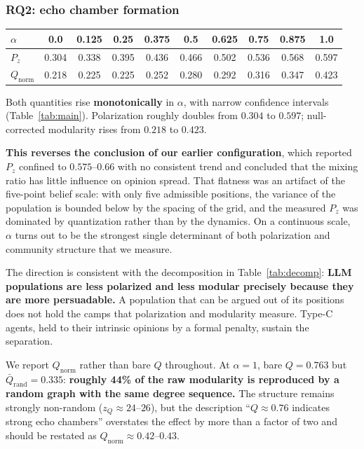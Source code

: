 \subsubsection{RQ2: echo chamber formation}
\label{sec:res-rq2}

\begin{center}
\begin{tabular}{lccccccccc}
\toprule
$\alpha$ & 0.0 & 0.125 & 0.25 & 0.375 & 0.5 & 0.625 & 0.75 & 0.875 & 1.0 \\
\midrule
$P_z$              & 0.304 & 0.338 & 0.395 & 0.436 & 0.466 & 0.502 & 0.536 & 0.568 & 0.597 \\
$Q_{\mathrm{norm}}$& 0.218 & 0.225 & 0.225 & 0.252 & 0.280 & 0.292 & 0.316 & 0.347 & 0.423 \\
\bottomrule
\end{tabular}
\end{center}

Both quantities rise \textbf{monotonically} in $\alpha$, with narrow confidence intervals
(Table~\ref{tab:main}). Polarization roughly doubles from $0.304$ to $0.597$;
null-corrected modularity rises from $0.218$ to $0.423$.

\textbf{This reverses the conclusion of our earlier configuration}, which reported $P_z$
confined to $0.575$--$0.66$ with no consistent trend and concluded that the mixing ratio
has little influence on opinion spread. That flatness was an artifact of the five-point
belief scale: with only five admissible positions, the variance of the population is
bounded below by the spacing of the grid, and the measured $P_z$ was dominated by
quantization rather than by the dynamics. On a continuous scale, $\alpha$ turns out to be
the strongest single determinant of both polarization and community structure that we
measure.

The direction is consistent with the decomposition in Table~\ref{tab:decomp}:
\textbf{LLM populations are less polarized and less modular precisely because they are
more persuadable.} A population that can be argued out of its positions does not hold the
camps that polarization and modularity measure. Type-C agents, held to their intrinsic
opinions by a formal penalty, sustain the separation.

We report $Q_{\mathrm{norm}}$ rather than bare $Q$ throughout. At $\alpha = 1$, bare
$Q = 0.763$ but $\bar{Q}_{\mathrm{rand}} = 0.335$: \textbf{roughly 44\% of the raw
modularity is reproduced by a random graph with the same degree sequence.} The structure
remains strongly non-random ($z_Q \approx 24$--$26$), but the description ``$Q \approx
0.76$ indicates strong echo chambers'' overstates the effect by more than a factor of
two and should be restated as $Q_{\mathrm{norm}} \approx 0.42$--$0.43$.

